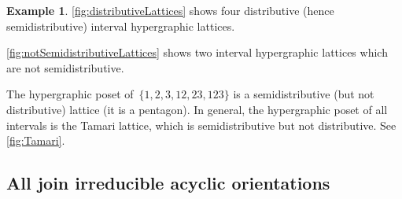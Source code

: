 \documentclass[reqno]{amsart}
\theoremstyle{definition}
\newtheorem{example}[theorem]{Example}
\begin{document}
\begin{example}
\cref{fig:distributiveLattices} shows four distributive (hence semidistributive) interval hypergraphic lattices.

\cref{fig:notSemidistributiveLattices} shows two interval hypergraphic lattices which are not semidistributive.

The hypergraphic poset of~$\{ 1, 2, 3, 12, 23, 123 \}$ is a semidistributive (but not distributive) lattice (it is a pentagon).
In general, the hypergraphic poset of all intervals is the Tamari lattice, which is semidistributive but not distributive.
See \cref{fig:Tamari}.
\end{example}


\subsection{All join irreducible acyclic orientations}
\label{subsec:joinIrreducibles}
\end{document}
